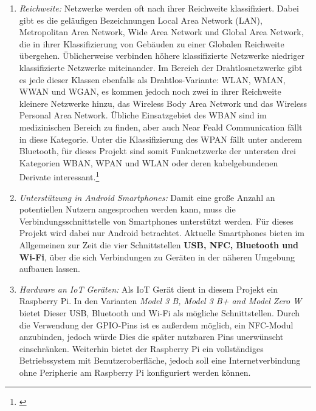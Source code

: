\documentclass[12pt,a4paper]{article}
\begin{document}
        \begin {enumerate}
        \item {\it Reichweite:}
        Netzwerke werden oft nach ihrer Reichweite klassifiziert. Dabei gibt es die geläufigen Bezeichnungen Local Area Network (LAN),
        Metropolitan Area Network, Wide Area Network und Global Area Network, die in ihrer Klassifizierung von Gebäuden zu einer Globalen Reichweite übergehen.
        Üblicherweise verbinden höhere klassifizierte Netzwerke niedriger klassifizierte Netzwerke miteinander. Im Bereich der Drahtlosnetzwerke gibt es jede
        dieser Klassen ebenfalls als Drahtlos-Variante: WLAN, WMAN, WWAN und WGAN, es kommen jedoch noch zwei in ihrer Reichweite kleinere Netzwerke hinzu,
        das Wireless Body Area Network und das Wireless Personal Area Network. Übliche Einsatzgebiet des WBAN sind im medizinischen Bereich zu finden,
        aber auch Near Feald Communication fällt in diese Kategorie. Unter die Klassifizierung des WPAN fällt unter anderem Bluetooth,
        für dieses Projekt sind somit Funknetzwerke der untersten drei Kategorien WBAN, WPAN und WLAN oder deren kabelgebundenen Derivate interessant.\footnote{\cite[S.17]{Lueders}}
        \item {\it Unterstützung in Android Smartphones:}
        Damit eine große Anzahl an potentiellen Nutzern angesprochen werden kann, muss die Verbindungsschnittstelle von Smartphones unterstützt werden.
        Für dieses Projekt wird dabei nur Android betrachtet.
        Aktuelle Smartphones bieten im Allgemeinen zur Zeit die vier Schnittstellen {\bf USB, NFC, Bluetooth und Wi-Fi},
        über die sich Verbindungen zu Geräten in der näheren Umgebung aufbauen lassen.
        \item {\it Hardware an IoT Geräten:}
        Als IoT Gerät dient in diesem Projekt ein Raspberry Pi.
        In den Varianten {\it Model 3 B, Model 3 B+ and Model Zero W} bietet Dieser USB, Bluetooth und Wi-Fi als mögliche Schnittstellen.
        Durch die Verwendung der GPIO-Pins ist es außerdem möglich, ein NFC-Modul anzubinden,
        jedoch würde Dies die später nutzbaren Pins unerwünscht einschränken.
        Weiterhin bietet der Raspberry Pi ein vollständiges Betriebssystem mit Benutzeroberfläche, jedoch soll eine Internetverbindung
        ohne Peripherie am Raspberry Pi konfiguriert werden können. 
        \end {enumerate}
\end{document}
